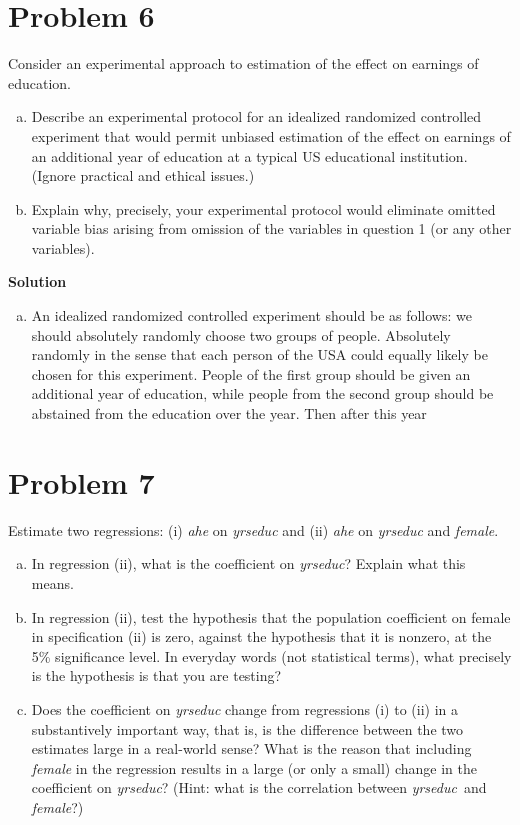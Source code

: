 \documentclass[a4paper]{article}
\newcommand{\yrseduc}{\textit{yrseduc}}
\begin{document}
\section*{Problem 6}
Consider an experimental approach to estimation of the effect on earnings of education.
\begin{enumerate}[(a)]
\item Describe an experimental protocol for an idealized randomized controlled experiment
that would permit unbiased estimation of the effect on earnings of an additional year of education at a typical US educational institution. (Ignore practical and ethical issues.)
\item Explain why, precisely, your experimental protocol would eliminate omitted variable
bias arising from omission of the variables in question 1 (or any other variables).
\end{enumerate}



\textbf{Solution}
\begin{enumerate}[(a)]
	\item An idealized randomized controlled experiment should be as follows: we should absolutely randomly choose two groups of people. Absolutely randomly in the sense that each person of the USA could equally likely be chosen for this experiment. People of the first group should be given an additional year of education, while people from the second group should be abstained from the education over the year. Then after this year 
\end{enumerate}
\section*{Problem 7}
Estimate two regressions: (i) \textit{ahe} on \textit{yrseduc} and (ii) \textit{ahe} on \textit{yrseduc} and \textit{female}.
\begin{enumerate}[(a)]
\item In regression (ii), what is the coefficient on \yrseduc? Explain what this means.
\item In regression (ii), test the hypothesis that the population coefficient on female in
specification (ii) is zero, against the hypothesis that it is nonzero, at the 5\% significance level.
In everyday words (not statistical terms), what precisely is the hypothesis is that you are
testing?
\item Does the coefficient on \textit{yrseduc} change from regressions (i) to (ii) in a substantively
important way, that is, is the difference between the two estimates large in a real-world sense?
What is the reason that including \textit{female} in the regression results in a large (or only a small)
change in the coefficient on \yrseduc? (Hint: what is the correlation between \yrseduc\ and
\textit{female}?)

\end{enumerate}
\end{document}
